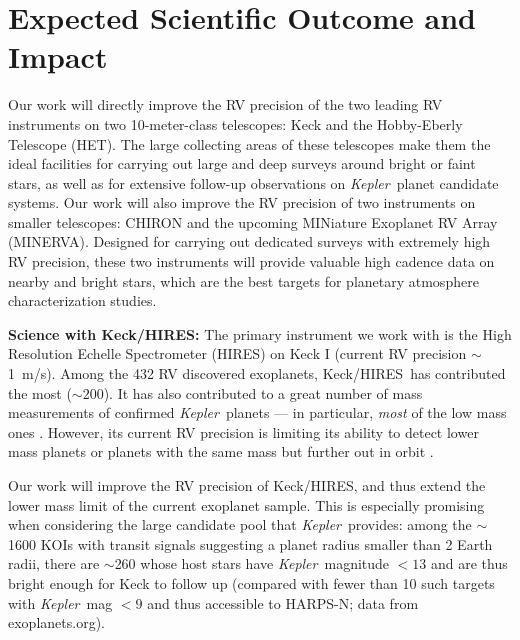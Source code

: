 \documentclass[12pt]{article}
\def\mps{m/s}
\def\kepler{{\it Kepler}}
\def\minerva{MINERVA}
\def\keck{Keck/HIRES}
\begin{document}
\vspace{-3pt}
\section{Expected Scientific Outcome and Impact}

Our work will directly improve the RV precision of the two leading RV
instruments on two 10-meter-class telescopes: Keck and the
Hobby-Eberly Telescope (HET). The large collecting areas of these
telescopes make them the ideal facilities for carrying out large and
deep surveys around bright or faint stars, as well as for extensive
follow-up observations on \kepler\ planet candidate systems. Our work
will also improve the RV precision of two instruments on
smaller telescopes: CHIRON and the upcoming MINiature Exoplanet RV
Array (\minerva). Designed for carrying out dedicated surveys with
extremely high RV precision, these two instruments will provide
valuable high cadence data on nearby and bright stars, which are the
best targets for planetary atmosphere characterization studies.

\textbf{Science with \keck: } The primary instrument we work with is
the High Resolution Echelle Spectrometer (HIRES) on Keck I (current RV
precision $\sim$1~\mps). Among the 432 RV discovered exoplanets,
\keck\ has contributed the most ($\sim$200). It has also contributed
to a great number of mass measurements of confirmed \kepler\ planets
--- in particular, \textit{most} of the low mass ones
\citep[e.g.,][]{gautier2012,gilliland2013,howard2013,marcy2014}. However,
its current RV precision is limiting its ability to detect lower mass
planets or planets with the same mass but further out in orbit
\citep[e.g.,][]{marcy2014}.

Our work will improve the RV precision of \keck, and thus extend the
lower mass limit of the current exoplanet sample. This is especially
promising when considering the large candidate pool that
\kepler\ provides: among the $\sim$1600 KOIs with transit signals
suggesting a planet radius smaller than 2 Earth radii, there are
$\sim$260 whose host stars have \kepler\ magnitude $< 13$ and are thus
bright enough for Keck to follow up (compared with fewer than 10 such
targets with \kepler\ mag $< 9$ and thus accessible to HARPS-N; data
from exoplanets.org).
\end{document}

